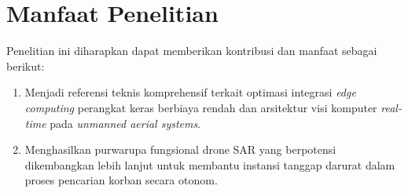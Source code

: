 \section{Manfaat Penelitian}
Penelitian ini diharapkan dapat memberikan kontribusi dan manfaat sebagai berikut:
\begin{enumerate}
	\item Menjadi referensi teknis komprehensif terkait optimasi integrasi \textit{edge computing} perangkat keras berbiaya rendah dan arsitektur visi komputer \textit{real-time} pada \textit{unmanned aerial systems}.
	\item Menghasilkan purwarupa fungsional drone SAR yang berpotensi dikembangkan lebih lanjut untuk membantu instansi tanggap darurat dalam proses pencarian korban secara otonom.
\end{enumerate}